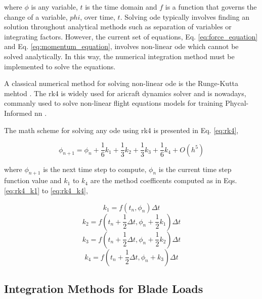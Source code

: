 \noindent where $\phi$ is any variable, $t$ is the time domain and $f$ is a function that governs the change of a variable, $phi$, over time, $t$. Solving \gls{ode} typically involves finding an solution throughout analytical methods such as separation of variables or integrating factors. However, the current set of equations, Eq. \ref{eq:force_equation} and Eq. \ref{eq:momentum_equation}, involves non-linear \gls{ode} which cannot be solved analytically. In this way, the numerical integration method must be implemented to solve the equations.

A classical numerical method for solving non-linear \gls{ode} is the Runge-Kutta mehtod \cite{arnold_numerical_2011}. The \gls{rk4} is widely used for aricraft dynamics solver \cite{ozdemir_linear_2008,milne_high-fidelity_2023,yoo_dynamics_2024} and is nowadays, commanly used to solve non-linear flight equations models for training Phycal-Informed \gls{nn} \cite{yu_aircraft_2019}.

The math scheme for solving any \gls{ode} using \gls{rk4} is presented in Eq. \ref{eq:rk4},

\begin{equation}
    \phi_{n+1} = \phi_{n} + \frac{1}{6} k_1 + \frac{1}{3} k_2 + \frac{1}{3} k_3 + \frac{1}{6} k_4 + O(h^5)
    \label{eq:rk4}
\end{equation}

\noindent where $\phi_{n+1}$ is the next time step to compute, $\phi_{n}$ is the current time step function value and $k_1$ to $k_4$ are the method coefficents computed as in Eqs. \ref{eq:rk4_k1} to \ref{eq:rk4_k4},

\begin{equation}
    k_1 = f\left(t_n, \phi_n\right) \Delta t
    \label{eq:rk4_k1}
\end{equation}
\begin{equation}
    k_2 = f\left(t_n + \frac{1}{2}\Delta t, \phi_n + \frac{1}{2} k_1\right) \Delta t
\end{equation}
\begin{equation}
    k_3 = f\left(t_n + \frac{1}{2}\Delta t, \phi_n + \frac{1}{2} k_2\right) \Delta t
\end{equation}
\begin{equation}
    k_4 = f\left(t_n + \frac{1}{2}\Delta t, \phi_n + k_3\right) \Delta t
    \label{eq:rk4_k4}
\end{equation}

\subsection{Integration Methods for Blade Loads}
\label{sec:blade_integration}


